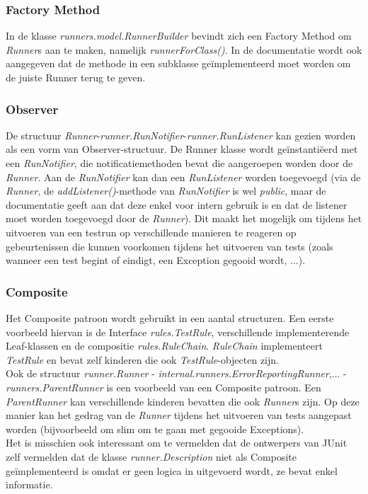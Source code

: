 \documentclass[i1]{oss}
\begin{document}
\subsubsection{Factory Method}
In de klasse \emph{runners.model.RunnerBuilder} bevindt zich een Factory Method om \emph{Runner}s aan te maken, namelijk \emph{runnerForClass()}. 
In de documentatie wordt ook aangegeven dat de methode in een subklasse ge\"implementeerd moet worden om de juiste Runner terug te geven.

\subsubsection{Observer}
De structuur \emph{Runner}-\emph{runner.RunNotifier}-\emph{runner.RunListener} kan gezien worden als een vorm van Observer-structuur. 
De Runner klasse wordt ge\"instanti\"eerd met een \emph{RunNotifier}, die notificatiemethoden bevat die aangeroepen worden door de \emph{Runner}. 
Aan de \emph{RunNotifier} kan dan een \emph{RunListener} worden toegevoegd (via de \emph{Runner}, de \emph{addListener()}-methode van \emph{RunNotifier} is wel \emph{public}, maar de documentatie geeft aan dat deze enkel voor intern gebruik is en dat de listener moet worden toegevoegd door de \emph{Runner}). 
Dit maakt het mogelijk om tijdens het uitvoeren van een testrun op verschillende manieren te reageren op gebeurtenissen die kunnen voorkomen tijdens het uitvoeren van tests (zoals wanneer een test begint of eindigt, een Exception gegooid wordt, ...).

\subsubsection{Composite}
Het Composite patroon wordt gebruikt in een aantal structuren. Een eerste voorbeeld hiervan is de Interface \emph{rules.TestRule}, verschillende implementerende Leaf-klassen en de compositie \emph{rules.RuleChain}. 
\emph{RuleChain} implementeert \emph{TestRule} en bevat zelf kinderen die ook \emph{TestRule}-objecten zijn.
\\
Ook de structuur \emph{runner.Runner} - \emph{internal.runners.ErrorReportingRunner},... - \emph{runners.ParentRunner} is een voorbeeld van een Composite patroon. 
Een \emph{ParentRunner} kan verschillende kinderen bevatten die ook \emph{Runner}s zijn. 
Op deze manier kan het gedrag van de \emph{Runner} tijdens het uitvoeren van tests aangepast worden (bijvoorbeeld om slim om te gaan met gegooide Exceptions).
\\
Het is misschien ook interessant om te vermelden dat de ontwerpers van JUnit zelf vermelden dat de klasse \emph{runner.Description} niet als Composite ge\"implementeerd is omdat er geen logica in uitgevoerd wordt, ze bevat enkel informatie.
\end{document}
